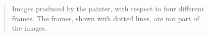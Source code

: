 \begin{figure}[tb]
\label{Figure 2.10}
\centering

\begin{quote}
 Images produced by the  painter, with respect to four different frames.  The frames, shown with dotted lines, are not part of the images.
\end{quote}
\end{figure}

